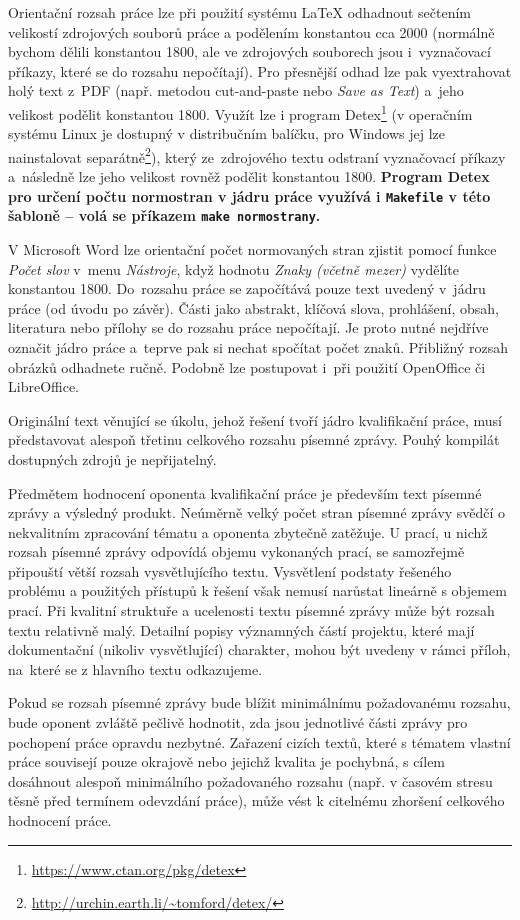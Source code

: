 Orientační rozsah práce lze při použití systému \LaTeX{} odhadnout sečtením velikostí zdrojových souborů práce a podělením konstantou cca 2000 (normálně bychom dělili konstantou 1800, ale ve zdrojových souborech jsou i~vyznačovací příkazy, které se do rozsahu nepočítají). Pro přesnější odhad lze pak vyextrahovat holý text z~PDF (např. metodou cut-and-paste nebo {\it Save as Text}) a~jeho velikost podělit konstantou 1800. Využít lze i program Detex\footnote{\url{https://www.ctan.org/pkg/detex}} (v operačním systému Linux je dostupný v distribučním balíčku, pro Windows jej lze nainstalovat separátně\footnote{\url{http://urchin.earth.li/~tomford/detex/}}), který ze~zdrojového textu odstraní vyznačovací příkazy a~následně lze jeho velikost rovněž podělit konstantou 1800. \bf Program Detex pro určení počtu normostran v jádru práce využívá i \texttt{Makefile} v této šabloně \rm -- volá se příkazem \verb|make normostrany|.

V Microsoft Word lze orientační počet normovaných stran zjistit pomocí funkce {\it Počet slov} v~menu {\it Nástroje}, když hodnotu {\it Znaky (včetně mezer)} vydělíte konstantou 1800. Do~rozsahu práce se započítává pouze text uvedený v~jádru práce (od úvodu po závěr). Části jako abstrakt, klíčová slova, prohlášení, obsah, literatura nebo přílohy se do rozsahu práce nepočítají. Je proto nutné nejdříve označit jádro práce a~teprve pak si nechat spočítat počet znaků. Přibližný rozsah obrázků odhadnete ručně. Podobně lze postupovat i~při použití OpenOffice či LibreOffice.


Originální text věnující se úkolu, jehož řešení tvoří jádro kvalifikační práce, musí představovat alespoň třetinu celkového rozsahu písemné zprávy. Pouhý kompilát dostupných zdrojů je nepřijatelný.

Předmětem hodnocení oponenta kvalifikační práce je především text písemné zprávy a výsledný produkt. Neúměrně velký počet stran písemné zprávy svědčí o nekvalitním zpracování tématu a oponenta zbytečně zatěžuje. U prací, u nichž rozsah písemné zprávy odpovídá objemu vykonaných prací, se samozřejmě připouští větší rozsah vysvětlujícího textu. Vysvětlení podstaty řešeného problému a použitých přístupů k řešení však nemusí narůstat lineárně s objemem prací. Při kvalitní struktuře a ucelenosti textu písemné zprávy může být rozsah textu relativně malý. Detailní popisy významných částí projektu, které mají dokumentační (nikoliv vysvětlující) charakter, mohou být uvedeny v rámci příloh, na~které se z hlavního textu odkazujeme.

Pokud se rozsah písemné zprávy bude blížit minimálnímu požadovanému rozsahu, bude oponent zvláště pečlivě hodnotit, zda jsou jednotlivé části zprávy pro pochopení práce opravdu nezbytné. Zařazení cizích textů, které s tématem vlastní práce souvisejí pouze okrajově nebo jejichž kvalita je pochybná, s cílem dosáhnout alespoň minimálního požadovaného rozsahu (např. v časovém stresu těsně před termínem odevzdání práce), může vést k citelnému zhoršení celkového hodnocení práce.

